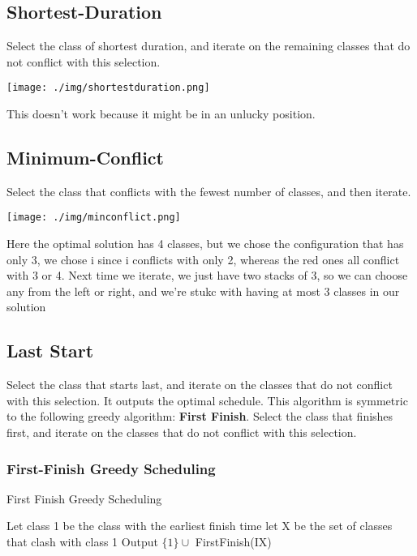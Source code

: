 \documentclass[11pt, a4paper, oneside]{book}
\theoremstyle{theoremdd}
\theoremstyle{remark}
\begin{document}
\subsection{Shortest-Duration}
Select the class of shortest duration, and iterate on the remaining classes that do not conflict with this selection.
\begin{center}
\texttt{[image: ./img/shortestduration.png]}
\end{center}
This doesn't work because it might be in an unlucky position.

\subsection{Minimum-Conflict}
Select the class that conflicts with the fewest number of classes, and then iterate.
\begin{center}
\texttt{[image: ./img/minconflict.png]}
\end{center}
Here the optimal solution has 4 classes, but we chose the configuration that has only 3, we chose i since i conflicts with only 2, whereas the red ones all conflict with 3 or 4. Next time we iterate, we just have two stacks of 3, so we can choose any from the left or right, and we’re stukc with having at most 3 classes in our solution

\subsection{Last Start}
Select the class that starts last, and iterate on the classes that do not conflict with this selection. It outputs the optimal schedule. This algorithm is symmetric to the following greedy algorithm: \textbf{First Finish}. Select the class that finishes first, and iterate on the classes that do not conflict with this selection. 
\subsubsection*{First-Finish Greedy Scheduling}
\begin{algorithm}[H]
\SetAlgoLined
{}
\caption{First Finish Greedy Scheduling}
Let class 1 be the class with the earliest finish time\;
let X be the set of classes that clash with class 1\;
Output $\{1\}\cup$ FirstFinish(I\setminus X)\;
\end{algorithm}
\end{document}
